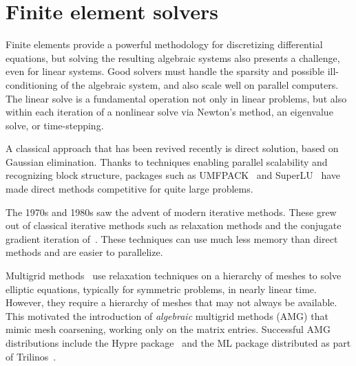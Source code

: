 \section{Finite element solvers}

Finite elements provide a powerful methodology for discretizing
differential equations, but solving the resulting algebraic systems
also presents a challenge, even for linear systems. Good solvers must
handle the sparsity and possible ill-conditioning of the algebraic
system, and also scale well on parallel computers.  The linear solve
is a fundamental operation not only in linear problems, but also
within each iteration of a nonlinear solve via Newton's method, an
eigenvalue solve, or time-stepping.

A classical approach that has been revived recently is direct
solution, based on Gaussian elimination.  Thanks to techniques
enabling parallel scalability and recognizing block structure,
packages such as UMFPACK~\citep{Davis2004} and SuperLU~\citep{Li2005}
have made direct methods competitive for quite large problems.

The 1970s and 1980s saw the advent of modern iterative methods. These
grew out of classical iterative methods such as relaxation methods and
the conjugate gradient iteration of~\citet{HestenesStiefel1952}. These
techniques can use much less memory than direct methods and are easier
to parallelize.

Multigrid methods~\citep{Brandt1977,Wesseling1992} use relaxation
techniques on a hierarchy of meshes to solve elliptic equations,
typically for symmetric problems, in nearly linear time. However, they
require a hierarchy of meshes that may not always be available.  This
motivated the introduction of \emph{algebraic} multigrid methods (AMG)
that mimic mesh coarsening, working only on the matrix entries.
Successful AMG distributions include the Hypre
package~\citep{FalgoutYang2002} and the ML package distributed as part
of Trilinos~\citep{HerouxBartlettHowleEtAl2005}.

